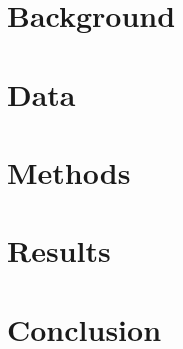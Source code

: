 \documentclass[11pt, english, letterpaper]{article}
\begin{document}
\newpage 

\newpage



\vspace{-5mm} \section*{}
\label{sec:intro}


\section{Background}
\label{sec:background}


\section{Data}
\label{sec:data}


\section{Methods}
\label{sec:methods}


\section{Results}
\label{sec:results}


\section{Conclusion}
\label{sec:conclusion}


% 

\newpage

\printbibliography

\setcounter{page}{0}
\setcounter{table}{0}
\setcounter{figure}{0}
\setcounter{section}{0}
\renewcommand{\thetable}{\thesection\arabic{table}}
\renewcommand{\thefigure}{\thesection\arabic{figure}}
\renewcommand{\thepage}{\thesection\arabic{page}}
\renewcommand\thesection{\Alph{section}}
\renewcommand\thesubsection{\thesection.\arabic{subsection}}
\newpage
\end{document}
